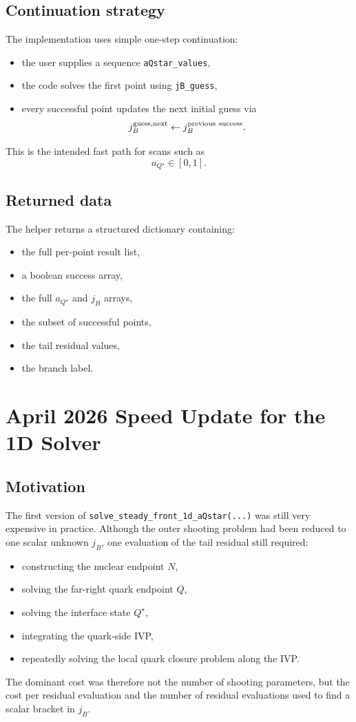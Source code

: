 \documentclass[11pt]{article}
\begin{document}
\subsection{Continuation strategy}
The implementation uses simple one-step continuation:
\begin{itemize}[leftmargin=1.5em]
\item the user supplies a sequence \texttt{aQstar\_values},
\item the code solves the first point using \texttt{jB\_guess},
\item every successful point updates the next initial guess via
      \[
      j_B^{\rm guess, next} \leftarrow j_B^{\rm previous\ success}.
      \]
\end{itemize}

This is the intended fast path for scans such as
\[
a_{Q^\star} \in [0,1].
\]

\subsection{Returned data}
The helper returns a structured dictionary containing:
\begin{itemize}[leftmargin=1.5em]
\item the full per-point result list,
\item a boolean success array,
\item the full $a_{Q^\star}$ and $j_B$ arrays,
\item the subset of successful points,
\item the tail residual values,
\item the branch label.
\end{itemize}


\section{April 2026 Speed Update for the 1D Solver}

\subsection{Motivation}
The first version of \texttt{solve\_steady\_front\_1d\_aQstar(...)} was still
very expensive in practice. Although the outer shooting problem had been reduced
to one scalar unknown $j_B$, one evaluation of the tail residual still required:
\begin{itemize}[leftmargin=1.5em]
\item constructing the nuclear endpoint $N$,
\item solving the far-right quark endpoint $Q$,
\item solving the interface state $Q^\star$,
\item integrating the quark-side IVP,
\item repeatedly solving the local quark closure problem along the IVP.
\end{itemize}
The dominant cost was therefore not the number of shooting parameters, but the
cost per residual evaluation and the number of residual evaluations used to find
a scalar bracket in $j_B$.
\end{document}

